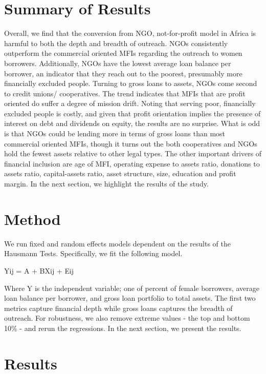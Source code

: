 \documentclass[
]{article}
\begin{document}
\hypertarget{summary-of-results}{%
\section{\texorpdfstring{\textbf{Summary of
Results}}{Summary of Results}}\label{summary-of-results}}

Overall, we find that the conversion from NGO, not-for-profit model in
Africa is harmful to both the depth and breadth of outreach. NGOs
consistently outperform the commercial oriented MFIs regarding the
outreach to women borrowers. Additionally, NGOs have the lowest average
loan balance per borrower, an indicator that they reach out to the
poorest, presumably more financially excluded people. Turning to gross
loans to assets, NGOs come second to credit unions/ cooperatives. The
trend indicates that MFIs that are profit oriented do suffer a degree of
mission drift. Noting that serving poor, financially excluded people is
costly, and given that profit orientation implies the presence of
interest on debt and dividends on equity, the results are no surprise.
What is odd is that NGOs could be lending more in terms of gross loans
than most commercial oriented MFIs, though it turns out the both
cooperatives and NGOs hold the fewest assets relative to other legal
types. The other important drivers of financial inclusion are age of
MFI, operating expense to assets ratio, donations to assets ratio,
capital-assets ratio, asset structure, size, education and profit
margin. In the next section, we highlight the results of the study.

\hypertarget{method}{%
\section{\texorpdfstring{\textbf{Method}}{Method}}\label{method}}

We run fixed and random effects models dependent on the results of the
Hausmann Tests. Specifically, we fit the following model.

Yij = A + BXij + Eij

Where Y is the independent variable; one of percent of female borrowers,
average loan balance per borrower, and gross loan portfolio to total
assets. The first two metrics capture financial depth while gross loans
captures the breadth of outreach. For robustness, we also remove extreme
values - the top and bottom 10\% - and rerun the regressions. In the
next section, we present the results.

\hypertarget{results}{%
\section{\texorpdfstring{\textbf{Results}}{Results}}\label{results}}
\end{document}
